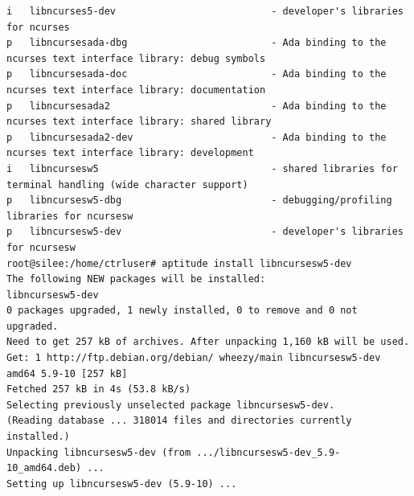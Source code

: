 \documentclass[11pt
  , a4paper
  , article
  , oneside
]{memoir}
\begin{document}
\begin{lstlisting}[style=termstyle]
i   libncurses5-dev                           - developer's libraries for ncurses                                  
p   libncursesada-dbg                         - Ada binding to the ncurses text interface library: debug symbols   
p   libncursesada-doc                         - Ada binding to the ncurses text interface library: documentation   
p   libncursesada2                            - Ada binding to the ncurses text interface library: shared library  
p   libncursesada2-dev                        - Ada binding to the ncurses text interface library: development     
i   libncursesw5                              - shared libraries for terminal handling (wide character support)    
p   libncursesw5-dbg                          - debugging/profiling libraries for ncursesw                         
p   libncursesw5-dev                          - developer's libraries for ncursesw                                 
root@silee:/home/ctrluser# aptitude install libncursesw5-dev
The following NEW packages will be installed:
libncursesw5-dev 
0 packages upgraded, 1 newly installed, 0 to remove and 0 not upgraded.
Need to get 257 kB of archives. After unpacking 1,160 kB will be used.
Get: 1 http://ftp.debian.org/debian/ wheezy/main libncursesw5-dev amd64 5.9-10 [257 kB]
Fetched 257 kB in 4s (53.8 kB/s)           
Selecting previously unselected package libncursesw5-dev.
(Reading database ... 318014 files and directories currently installed.)
Unpacking libncursesw5-dev (from .../libncursesw5-dev_5.9-10_amd64.deb) ...
Setting up libncursesw5-dev (5.9-10) ...


\end{lstlisting}
\end{document}

